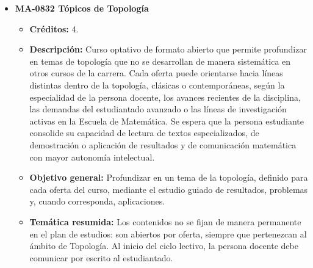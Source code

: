 \begin{itemize}[leftmargin=1.3em, itemsep=10pt, topsep=4pt, label={\color{Azul-UCR}$\blacksquare$}]
\item {\color{Azul-UCR}\textbf{MA-0832 Tópicos de Topología}}\par\nopagebreak\smallskip
\begin{itemize}[leftmargin=1.1em, itemsep=3pt, topsep=2pt, parsep=2pt, label={\textendash}]
\item \textbf{Créditos:} 4.
\item \textbf{Descripción:} Curso optativo de formato abierto que permite profundizar en temas de topología que no se desarrollan de manera sistemática en otros cursos de la carrera. Cada oferta puede orientarse hacia líneas distintas dentro de la topología, clásicas o contemporáneas, según la especialidad de la persona docente, los avances recientes de la disciplina, las demandas del estudiantado avanzado o las líneas de investigación activas en la Escuela de Matemática. Se espera que la persona estudiante consolide su capacidad de lectura de textos especializados, de demostración o aplicación de resultados y de comunicación matemática con mayor autonomía intelectual.
\item \textbf{Objetivo general:} Profundizar en un tema de la topología, definido para cada oferta del curso, mediante el estudio guiado de resultados, problemas y, cuando corresponda, aplicaciones.
\item \textbf{Temática resumida:} Los contenidos no se fijan de manera permanente en el plan de estudios: son abiertos por oferta, siempre que pertenezcan al ámbito de Topología. Al inicio del ciclo lectivo, la persona docente debe comunicar por escrito al estudiantado.
\end{itemize}


\end{itemize}
